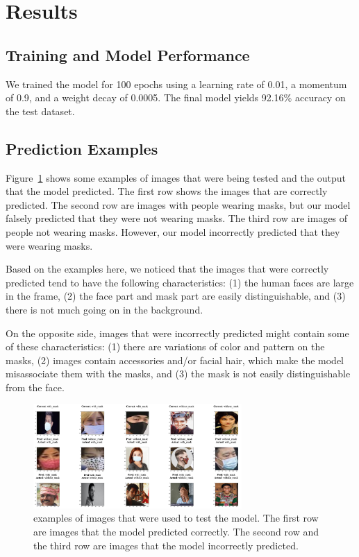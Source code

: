 \section{Results}

\subsection{Training and Model Performance}

We trained the model for 100 epochs using a learning rate of 0.01, a momentum of 0.9, and a weight decay of 0.0005. The final model yields 92.16\% accuracy on the test dataset.

\subsection{Prediction Examples}

Figure~\ref{fig:prediction-examples} shows some examples of images that were being tested and the output that the model predicted. The first row shows the images that are correctly predicted. The second row are images with people wearing masks, but our model falsely predicted that they were not wearing masks. The third row are images of people not wearing masks. However, our model incorrectly predicted that they were wearing masks.

Based on the examples here, we noticed that the images that were correctly predicted tend to have the following characteristics: (1) the human faces are large in the frame, (2) the face part and mask part are easily distinguishable, and (3) there is not much going on in the background.

On the opposite side, images that were incorrectly predicted might contain some of these characteristics: (1) there are variations of color and pattern on the masks, (2) images contain accessories and/or facial hair, which make the model misassociate them with the masks, and (3) the mask is not easily distinguishable from the face.

\begin{figure}
  \caption{
    examples of images that were used to test the model. The first row are images that the model predicted correctly. The second row and the third row are images that the model incorrectly predicted.
  }
  \label{fig:prediction-examples}
  \centering
  \includegraphics[width=300px]{figures/prediction-examples.png}
\end{figure}

